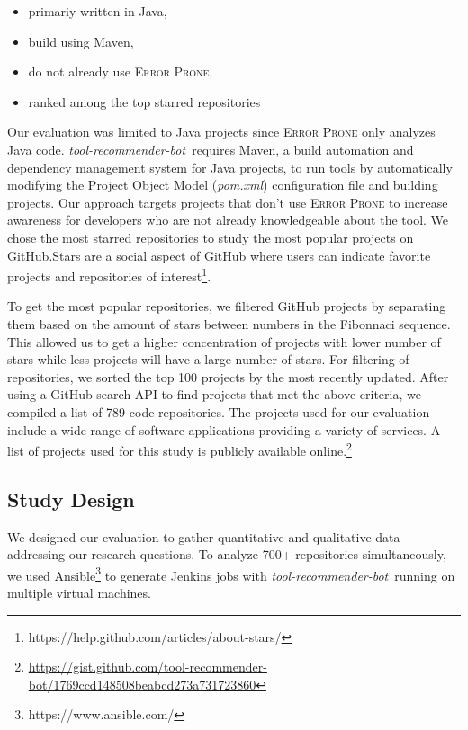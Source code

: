\documentclass[sigconf,review,anonymous]{acmart}
\newcommand{\tool}{\textsl{tool-recommender-bot}}
\begin{document}
\begin{itemize}
\item primariy written in Java,
\item build using Maven,
\item do not already use \textsc{Error Prone},
\item ranked among the top starred repositories
\end{itemize}

Our evaluation was limited to Java projects since \textsc{Error Prone} only analyzes Java code. \tool~requires Maven, a build automation and dependency management system for Java projects, to run tools by automatically modifying the Project Object Model (\textit{pom.xml}) configuration file and building projects.  Our approach targets projects that don't use \textsc{Error Prone} to increase awareness for developers who are not already knowledgeable about the tool. We chose the most starred repositories to study the most popular projects on GitHub.Stars are a social aspect of GitHub where users can indicate favorite projects and repositories of interest\footnote{https://help.github.com/articles/about-stars/}. 

To get the most popular repositories, we filtered GitHub projects by separating them based on the amount of stars between numbers in the Fibonnaci sequence. This allowed us to get a higher concentration of projects with lower number of stars while less projects will have a large number of stars. For filtering of repositories, we sorted the top 100 projects by the most recently updated. After using a GitHub search API to find projects that met the above criteria, we compiled a list of 789 code repositories. The projects used for our evaluation include a wide range of software applications providing a variety of services. A list of projects used for this study is publicly available online.\footnote{\url{https://gist.github.com/tool-recommender-bot/1769ccd148508beabcd273a731723860}}

\subsection{Study Design}

We designed our evaluation to gather quantitative and qualitative data addressing our research questions.  To analyze 700+ repositories simultaneously, we used Ansible\footnote{https://www.ansible.com/} to generate Jenkins jobs with \tool~running on multiple virtual machines.
\end{document}
